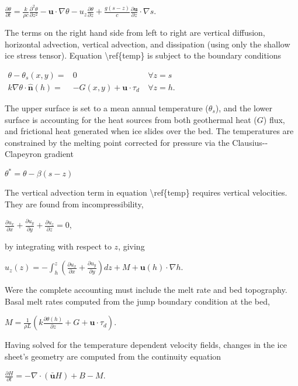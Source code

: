 $ 
\frac{\partial \theta}{\partial t} = \frac{k}{\rho c}
\frac{\partial^2
\theta}{\partial z^2} -
\mathbf{u} \cdot \nabla \theta -
u_z \frac{\partial \theta}{\partial z} 
+ \frac{g(s-z)}{c}\frac{\partial \mathbf{u}}{\partial z} \cdot \nabla s.
$

The terms on the right hand side from left to right are vertical
diffusion, horizontal advection, vertical advection, and dissipation
(using only the shallow ice stress tensor). Equation
\textbackslash{}ref\{temp\} is subject to the boundary conditions

$\begin{matrix}
\theta - \theta_s(x,y) = & 0 &~\forall z=s \\
k \nabla \theta \cdot \mathbf{\hat n}(h) =& -G(x,y) + \mathbf{u} \cdot \tau_d
&~\forall z=h.
\end{matrix}$

The upper surface is set to a mean annual temperature ($\theta_s$), and
the lower surface is accounting for the heat sources from both
geothermal heat ($G$) flux, and frictional heat generated when ice
slides over the bed. The temperatures are constrained by the melting
point corrected for pressure via the Clausius-{}-Clapeyron gradient

$
\theta^* = \theta - \beta (s-z)
$

The vertical advection term in equation \textbackslash{}ref\{temp\}
requires vertical velocities. They are found from incompressibility,

$
\frac{\partial u_x}{\partial x} + 
\frac{\partial u_y}{\partial y} +
\frac{\partial u_z}{\partial z} = 0,
$

by integrating with respect to $z$, giving

$
u_z(z) = -\int_h^z \left( \frac{\partial u_x}{\partial x} + \frac{\partial
u_y}{\partial y}\right ) dz + M + \mathbf{u}(h) \cdot \nabla h.
$

Were the complete accounting must include the melt rate and bed
topography. Basal melt rates computed from the jump boundary condition
at the bed,

$
M = \frac{1}{\rho L} \left ( k \frac{\partial
\theta(h)}{\partial z} + G + \mathbf{u} \cdot \tau_d \right ).
$

Having solved for the temperature dependent velocity fields, changes in
the ice sheet's geometry are computed from the continuity equation

$
\frac{\partial H}{\partial t} = - \nabla \cdot (\mathbf{\bar u} H) + B - M.
$

